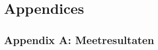 \documentclass[twoside]{article}
\begin{document}
\begin{multicols}{2}



\end{multicols}


\newpage
\section{Appendices}
\subsection{Appendix A: Meetresultaten} \label{AppendixA}
\end{document}
